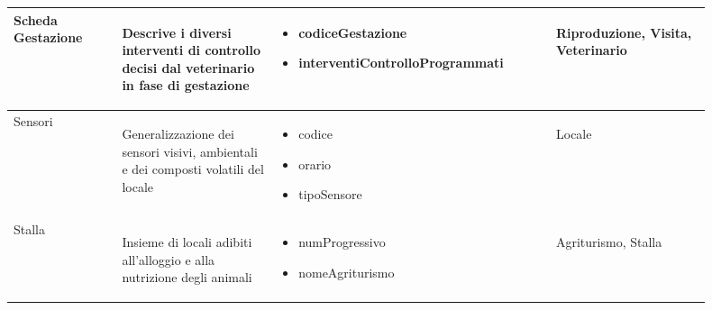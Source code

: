 \documentclass[12pt,a4paper]{article}
\begin{document}
\begin{center}
\begin{longtable}{|p{0.14\linewidth}|p{0.20\linewidth}|p{0.36\linewidth}|p{0.20\linewidth}|}
\hline
Scheda Gestazio\-ne 	& \begin{flushleft}\vspace{-25pt} Descrive i diversi interventi di controllo decisi dal veterinario in fase di gestazione \end{flushleft}
					& \begin{itemize}
						\setlength{\itemindent}{-1em}
						\vspace{-25pt}
						\setlength\itemsep{-0.25em}
						\item codiceGestazione
						\item interventi\-Controllo\-Programmati
						
						
					\end{itemize}
					& \begin{flushleft}\vspace{-25pt} Riproduzione, Visita, Veterinario \end{flushleft}\\

\hline
Sensori 				& \begin{flushleft}\vspace{-25pt} Ge\-ne\-ra\-liz\-za\-zio\-ne dei sensori visivi, ambientali e dei composti volatili del locale  \end{flushleft}
					& \begin{itemize}
						\setlength{\itemindent}{-1em}
						\vspace{-25pt}
						\setlength\itemsep{-0.25em}
						\item codice
						\item orario
						\item tipoSensore
						
					\end{itemize}
					& \begin{flushleft}\vspace{-25pt} Locale \end{flushleft}\\

\hline
Stalla 				& \begin{flushleft}\vspace{-25pt} Insieme di locali adibiti all'alloggio e alla nutrizione degli animali  \end{flushleft}
					& \begin{itemize}
						\setlength{\itemindent}{-1em}
						\vspace{-25pt}
						\setlength\itemsep{-0.25em}
						\item numProgressivo
						\item nomeAgriturismo
					\end{itemize} 
					& \begin{flushleft}\vspace{-25pt} Agriturismo, Stalla \end{flushleft} \\


\end{longtable}
\end{center}
\end{document}
